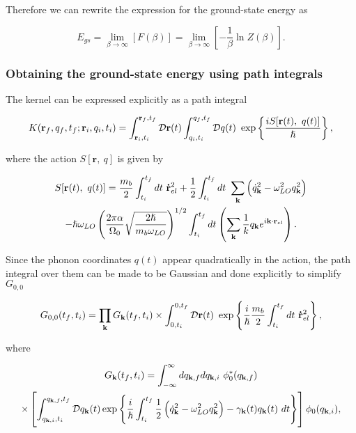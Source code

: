 Therefore we can rewrite the expression for the ground-state energy as

\begin{equation}
    E_{gs} = \lim_{\beta \to \infty}\left[F(\beta) \right] = \lim_{\beta \to \infty} \left[-\frac{1}{\beta} \ln Z(\beta) \right].
\end{equation}

\subsubsection{Obtaining the ground-state energy using path integrals}

The kernel can be expressed explicitly as a path integral

\begin{equation}
    K(\vb{r}_f, q_f, t_f; \vb{r}_i, q_i, t_i) = \int_{\vb{r}_i, t_i}^{\vb{r}_f, t_f} \mathcal{D} \vb{r}(t) \int_{q_i, t_i}^{q_f, t_f} \mathcal{D}q(t)\ \exp\left\{{\frac{iS[\vb{r}(t),\ q(t)]}{\hslash}}\right\},
\end{equation}

where the action $S[\mathbf{r},\ q]$ is given by

\begin{equation}
\begin{gathered}
    S[\mathbf{r}(t),\ q(t)] = \frac{m_b}{2} \int_{t_i}^{t_f} dt\ \vb{\dot{r}}^2_{el} + \frac{1}{2} \int_{t_i}^{t_f} dt\ \sum_{\vb{k}} \left( \dot{q}_{\vb{k}}^2 - \omega_{LO}^2 q_{\vb{k}}^2 \right) \\
    - \hslash \omega_{LO} \left(\frac{2 \pi \alpha}{\Omega_0} \sqrt{\frac{2 \hslash}{m_b \omega_{LO}}}\right)^{1/2} \int_{t_i}^{t_f} dt \left( \sum_{\vb{k}} \frac{1}{k} q_{\vb{k}} e^{i \vb{k} \cdot \vb{r}_{el}} \right). 
\end{gathered}
\end{equation}

Since the phonon coordinates $q(t)$ appear quadratically in the action, the path integral over them can be made to be Gaussian and done explicitly to simplify $G_{0,0}$

\begin{equation}
    G_{0,0}(t_f, t_i) = \prod_{\vb{k}} G_{\vb{k}}(t_f, t_i) \times \int^{0, t_f}_{0, t_i} \mathcal{D}\vb{r}(t)\ \exp\left\{ \frac{i}{\hslash}  \frac{m_b}{2} \int^{t_f}_{t_i} dt\ \vb{\dot{r}}_{el}^2  \right\},
\end{equation}

where

\begin{equation}
\begin{gathered}
    G_{\vb{k}}(t_f, t_i) = \int_{-\infty}^{\infty} dq_{\vb{k}, f} dq_{\vb{k}, i}\ \phi_0^*(q_{\vb{k}, f}) \\
    \times \left[\int^{q_{\vb{k},f}, t_f}_{q_{\vb{k}, i}, t_i} \mathcal{D}q_{\vb{k}}(t) \exp \left\{\frac{i}{\hslash} \int_{t_i}^{t_f} \frac{1}{2}\left(\dot{q}_{\vb{k}}^2 - \omega_{LO}^2 q_{\vb{k}}^2 \right) - \gamma_{\vb{k}}(t) q_{\vb{k}}(t)\ dt \right\} \right] \phi_0(q_{\vb{k}, i}),
\end{gathered}
\end{equation}

